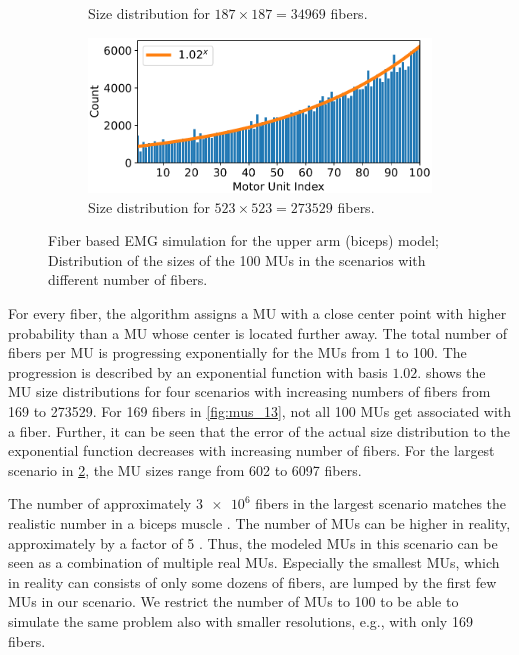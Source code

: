 \begin{figure}
\begin{subfigure}[t]{0.45\textwidth}
    \caption{Size distribution for $187\times 187 = \num{34969}$ fibers.}%
    \label{fig:mus_187}%
  \end{subfigure} 
  \begin{subfigure}[t]{0.45\textwidth}%
    \centering%
    \includegraphics[width=\textwidth]{images/results/application/MU_fibre_distribution_523x523_100mus_txt_fiber_distribution.pdf}%
    \caption{Size distribution for $523\times 523 = \num{273529}$ fibers.}%
    \label{fig:mus_523}%
  \end{subfigure}   
  \caption{Fiber based EMG simulation for the upper arm (biceps) model; Distribution of the sizes of the 100 MUs in the scenarios with different number of fibers.}%
  \label{fig:mu_sizes_100mus}%
\end{figure}%


For every fiber, the algorithm assigns a MU with a close center point with higher probability than a MU whose center is located further away. The total number of fibers per MU is progressing exponentially for the MUs from 1 to 100. The progression is described by an exponential function with basis $1.02$.  shows the MU size distributions for four scenarios with increasing numbers of fibers from \num{169} to \num{273529}. For 169 fibers in \cref{fig:mus_13}, not all 100 MUs get associated with a fiber. Further, it can be seen that the error of the actual size distribution to the exponential function decreases with increasing number of fibers. For the largest scenario in \cref{fig:mus_523}, the MU sizes range from 602 to 6097 fibers.

The number of approximately $\num{3e6}$ fibers in the largest scenario matches the realistic number in a biceps muscle \cite{MacDougall1984}. The number of MUs can be higher in reality, approximately by a factor of 5 \cite{Feinstein1955,MacIntosh2006}. Thus, the modeled MUs in this scenario can be seen as a combination of multiple real MUs. Especially the smallest MUs, which in reality can consists of only some dozens of fibers, are lumped by the first few MUs in our scenario. We restrict the number of MUs to 100 to be able to simulate the same problem also with smaller resolutions, e.g., with only 169 fibers.

